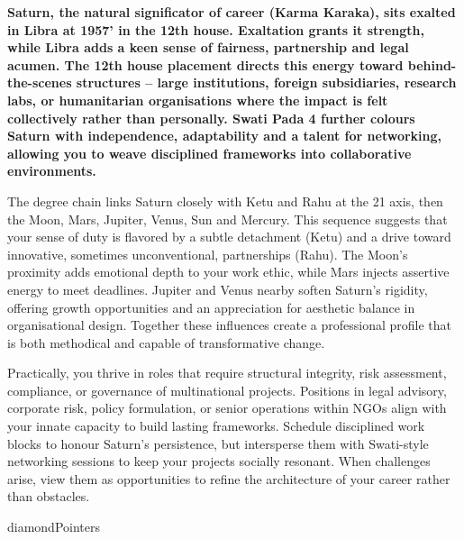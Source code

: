 {\fontsize{9.5}{13.8}\selectfont\bfseries\color{DeepSlate} Saturn, the natural significator of career (Karma Karaka), sits exalted in Libra at 19\textdegree{}57' in the 12th house. Exaltation grants it strength, while Libra adds a keen sense of fairness, partnership and legal acumen. The 12th house placement directs this energy toward behind-the-scenes structures -- large institutions, foreign subsidiaries, research labs, or humanitarian organisations where the impact is felt collectively rather than personally. Swati Pada 4 further colours Saturn with independence, adaptability and a talent for networking, allowing you to weave disciplined frameworks into collaborative environments.}\par\vspace{2mm}

{\fontsize{9}{13}\selectfont The degree chain links Saturn closely with Ketu and Rahu at the 21\textdegree{} axis, then the Moon, Mars, Jupiter, Venus, Sun and Mercury. This sequence suggests that your sense of duty is flavored by a subtle detachment (Ketu) and a drive toward innovative, sometimes unconventional, partnerships (Rahu). The Moon's proximity adds emotional depth to your work ethic, while Mars injects assertive energy to meet deadlines. Jupiter and Venus nearby soften Saturn's rigidity, offering growth opportunities and an appreciation for aesthetic balance in organisational design. Together these influences create a professional profile that is both methodical and capable of transformative change.}\par\vspace{1.8mm}

{\fontsize{9}{13}\selectfont Practically, you thrive in roles that require structural integrity, risk assessment, compliance, or governance of multinational projects. Positions in legal advisory, corporate risk, policy formulation, or senior operations within NGOs align with your innate capacity to build lasting frameworks. Schedule disciplined work blocks to honour Saturn's persistence, but intersperse them with Swati-style networking sessions to keep your projects socially resonant. When challenges arise, view them as opportunities to refine the architecture of your career rather than obstacles.}\par\vspace{1.8mm}

{\fontsize{9}{13}\selectfont diamondPointers}\par\vspace{1.8mm}


